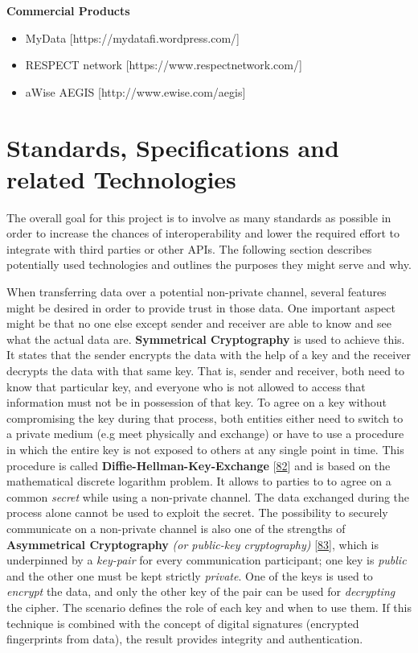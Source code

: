 \documentclass[12pt,english,a4paper,titlepage,cleardoublepage=empty,dottedtoc]{report}
\providecommand{\tightlist}{%
  \setlength{\itemsep}{0pt}\setlength{\parskip}{0pt}}
\begin{document}
\textbf{Commercial Products}

\begin{itemize}
\tightlist
\item
  MyData {[}https://mydatafi.wordpress.com/{]}
\item
  RESPECT network {[}https://www.respectnetwork.com/{]}
\item
  aWise AEGIS {[}http://www.ewise.com/aegis{]}
\end{itemize}

\hypertarget{standards-specifications-and-related-technologies}{\section{Standards,
Specifications and related
Technologies}\label{standards-specifications-and-related-technologies}}

The overall goal for this project is to involve as many standards as
possible in order to increase the chances of interoperability and lower
the required effort to integrate with third parties or other APIs. The
following section describes potentially used technologies and outlines
the purposes they might serve and why.

When transferring data over a potential non-private channel, several
features might be desired in order to provide trust in those data. One
important aspect might be that no one else except sender and receiver
are able to know and see what the actual data are. \textbf{Symmetrical
Cryptography} is used to achieve this. It states that the sender
encrypts the data with the help of a key and the receiver decrypts the
data with that same key. That is, sender and receiver, both need to know
that particular key, and everyone who is not allowed to access that
information must not be in possession of that key. To agree on a key
without compromising the key during that process, both entities either
need to switch to a private medium (e.g meet physically and exchange) or
have to use a procedure in which the entire key is not exposed to others
at any single point in time. This procedure is called
\textbf{Diffie-Hellman-Key-Exchange}
{[}\protect\hyperlink{ref-paper_1976_d-h-key-exchange}{82}{]} and is
based on the mathematical discrete logarithm problem. It allows to
parties to to agree on a common \emph{secret} while using a non-private
channel. The data exchanged during the process alone cannot be used to
exploit the secret. The possibility to securely communicate on a
non-private channel is also one of the strengths of
\textbf{\protect\hypertarget{def--asym-crypto}{}{Asymmetrical
Cryptography}} \emph{(or public-key cryptography)}
{[}\protect\hyperlink{ref-book_2014_chapter-9-1-public-key-crypto}{83}{]},
which is underpinned by a \emph{key-pair} for every communication
participant; one key is \emph{public} and the other one must be kept
strictly \emph{private}. One of the keys is used to \emph{encrypt} the
data, and only the other key of the pair can be used for
\emph{decrypting} the cipher. The scenario defines the role of each key
and when to use them. If this technique is combined with the concept of
digital signatures (encrypted fingerprints from data), the result
provides integrity and authentication.
\end{document}
